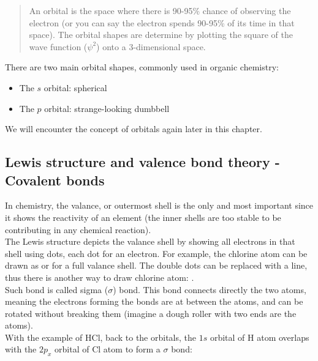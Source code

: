 \documentclass{report}
\begin{document}
		\blockquote{An orbital is the space where there is 90-95\% chance of observing the electron (or you can say the electron spends 90-95\% of its time in that space). The orbital shapes are determine by plotting the square of the wave function   ($\psi^2$) onto a 3-dimensional space.}
		
		There are two main orbital shapes, commonly used in organic chemistry:
		\begin{itemize}
			\item{The $s$ orbital: spherical} \quad
			\item{The $p$ orbital: strange-looking dumbbell} \quad
		\end{itemize}
We will encounter the concept of orbitals again later in this chapter.

	\subsection{Lewis structure and valence bond theory - Covalent bonds}
		In chemistry, the valance, or outermost shell is the only and most important since it shows the reactivity of an element (the inner shells are too stable to be contributing in any chemical reaction). \\
		
		The Lewis structure depicts the valance shell by showing all electrons in that shell using dots, each dot for an electron. For example, the chlorine atom can be drawn as 
		 or 
		for a full valance shell. The double dots can be replaced with a line, thus there is another way to draw chlorine atom: 
		. \\
		
		Such bond is called sigma ($\sigma$) bond. This bond connects directly the two atoms, meaning the electrons forming the bonds are at between the atoms, and can be rotated without breaking them (imagine a dough roller with two ends are the atoms). \\
		
		With the example of HCl, back to the orbitals, the $1s$ orbital of H atom overlaps with the $2p_x$ orbital of Cl atom to form a $\sigma$ bond:
		\begin{center}
			\vspace{5mm}
			\setbondoffset{0pt}
			\vspace{5mm}
		\end{center}
		
\end{document}
